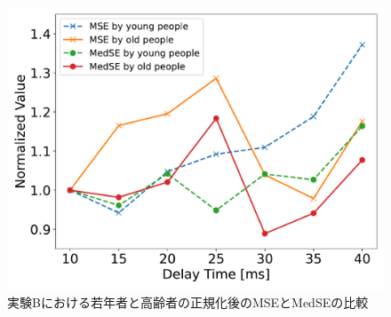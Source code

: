 \begin{figure}[tbp]
  \centering
  \includegraphics[scale=0.3]{figures/Honbann/Comparison_young_old/40_MSE-MedSE_normalized.pdf}
  \caption{実験Bにおける若年者と高齢者の正規化後のMSEとMedSEの比較}
  \label{fig:Normalized_40ms_MSE_MedSE}
\end{figure}